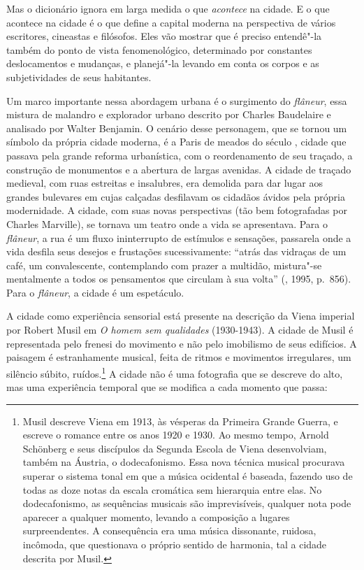 Mas o dicionário ignora em larga medida o que \emph{acontece} na cidade.
E o que acontece na cidade é o que define a capital moderna na
perspectiva de vários escritores, cineastas e filósofos. Eles vão
mostrar que é preciso entendê"-la também do ponto de vista
fenomenológico, determinado por constantes deslocamentos e mudanças, e
planejá"-la levando em conta os corpos e as subjetividades de seus
habitantes.

Um marco importante nessa abordagem urbana é o surgimento do
\emph{flâneur}, essa mistura de malandro e explorador urbano descrito
por Charles Baudelaire e analisado por Walter Benjamin. O cenário desse
personagem, que se tornou um símbolo da própria cidade moderna, é a
Paris de meados do século , cidade que passava pela grande reforma
urbanística, com o reordenamento de seu traçado, a construção de
monumentos e a abertura de largas avenidas. A cidade de traçado
medieval, com ruas estreitas e insalubres, era demolida para dar lugar
aos grandes bulevares em cujas calçadas desfilavam os cidadãos ávidos
pela própria modernidade. A cidade, com suas novas perspectivas (tão bem
fotografadas por Charles Marville), se tornava um teatro onde a vida se
apresentava. Para o \emph{flâneur}, a rua é um fluxo ininterrupto de
estímulos e sensações, passarela onde a vida desfila seus desejos e
frustações sucessivamente: ``atrás das vidraças de um café, um
convalescente, contemplando com prazer a multidão, mistura"-se
mentalmente a todos os pensamentos que circulam à sua volta''
(, 1995, p.~856). Para o \emph{flâneur}, a cidade é um
espetáculo.

A cidade como experiência sensorial está presente na descrição da Viena
imperial por Robert Musil em \emph{O homem sem qualidades} (1930-1943). A
cidade de Musil é representada pelo frenesi do movimento e não pelo
imobilismo de seus edifícios. A paisagem é estranhamente musical, feita
de ritmos e movimentos irregulares, um silêncio súbito,
ruídos.\footnote{Musil descreve Viena em 1913, às vésperas da Primeira
  Grande Guerra, e escreve o romance entre os anos 1920 e 1930. Ao mesmo
  tempo, Arnold Schönberg e seus discípulos da Segunda Escola de Viena
  desenvolviam, também na Áustria, o dodecafonismo. Essa nova técnica
  musical procurava superar o sistema tonal em que a música ocidental é
  baseada, fazendo uso de todas as doze notas da escala cromática sem
  hierarquia entre elas. No dodecafonismo, as sequências musicais são
  imprevisíveis, qualquer nota pode aparecer a qualquer momento, levando
  a composição a lugares surpreendentes. A consequência era uma música
  dissonante, ruidosa, incômoda, que questionava o próprio sentido de
  harmonia, tal a cidade descrita por Musil.} A cidade não é uma
fotografia que se descreve do alto, mas uma experiência temporal que se
modifica a cada momento que passa:

